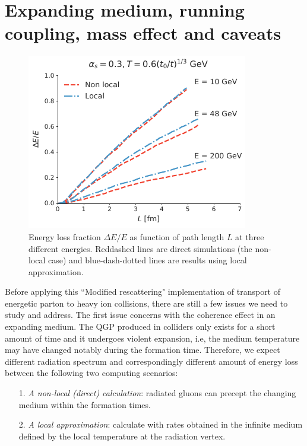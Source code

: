 \documentclass[aps, prc, reprint, amsmath, groupedaddress, nofootinbib]{revtex4-1}
\begin{document}
\section{Expanding medium, running coupling, mass effect and caveats}\label{section:disscuss}
\begin{figure}
\includegraphics[width=\columnwidth]{Bjorken.pdf}
\caption{Energy loss fraction $\Delta E /E$ as function of path length $L$ at three different energies. Reddashed lines are direct simulations (the non-local case) and blue-dash-dotted lines are results using local approximation.}
\label{fig:Bjorken}
\end{figure}
Before applying this ``Modified rescattering" implementation of transport of energetic parton to heavy ion collisions, there are still a few issues we need to study and address.
The first issue concerns with the coherence effect in an expanding medium. 
The QGP produced in colliders only exists for a short amount of time and it undergoes violent expansion, i.e, the medium temperature may have changed notably during the formation time.
Therefore, we expect different radiation spectrum and correspondingly different amount of energy loss between the following two computing scenarios:
\begin{itemize}
\item[1.]  {\it A non-local (direct) calculation}: radiated gluons can precept the changing medium within the formation times.
\item[2.] {\it A local approximation}: calculate with rates obtained in the infinite medium defined by the local temperature at the radiation vertex.
\end{itemize} 
\end{document}
